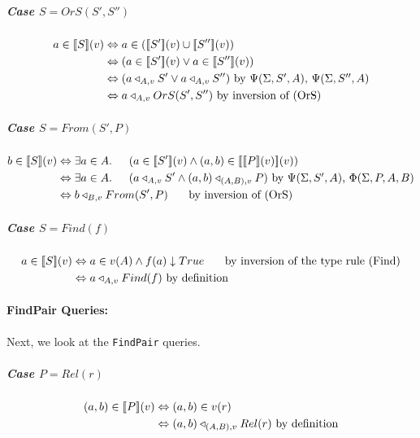 \documentclass[12pt,a4paper,twoside,openright]{report}
\newcommand\codeName[1]{\texttt{#1}}
\newcommand{\db}[1]{{\bf [\![}#1{\bf ]\!]}}
\newcommand{\deno}[1]{\db{#1}(v)}
\newcommand{\denoRule}[2]{#1 \in \deno{#2}}
\newcommand{\opRule}[3]{#1 \triangleleft_{#2, v} #3}
\newcommand{\phiRule}[3]{\Phi(\Sigma, #1, #2, #3)}
\newcommand{\psiRule}[2]{\Psi(\Sigma, #1, #2)}
\let\oldparagraph\paragraph
\renewcommand{\paragraph}[1]{\oldparagraph{#1}\mbox{}}
\let\oldsubparagraph\subparagraph
\renewcommand{\subparagraph}[1]{\oldsubparagraph{#1}\mbox{}}
\begin{document}
\subparagraph{Case $S = OrS(S', S'')$}
\begin{equation} \label{case OrS}
\begin{split}
\denoRule{a}{S} & \Leftrightarrow a \in (\deno{S'} \cup \deno{S''}) \\
				& \Leftrightarrow (\denoRule{a}{S'} \vee \denoRule{a}{S''}) \\
				& \Leftrightarrow (\opRule{a}{A}{S'} \vee \opRule{a}{A}{S''}) \mbox{ by $\psiRule{S'}{A}$, $\psiRule{S''}{A}$}\\
				& \Leftrightarrow \opRule{a}{A}{OrS(S', S'')} \mbox{ by inversion of (OrS)}
\end{split}
\end{equation}

\subparagraph{Case $S = From(S', P)$}
\begin{equation} \label{case From}
\begin{split}
\denoRule{b}{S} & \Leftrightarrow \exists a \in A. \indent (\denoRule{a}{S'} \wedge \denoRule{(a, b)}{\deno{P}}) \\
				& \Leftrightarrow \exists a \in A. \indent (\opRule{a}{A}{S'} \wedge \opRule{(a, b)}{(A, B)}{P}) \mbox{ by $\psiRule{S'}{A}$, $\phiRule{P}{A}{B}$}\\
				& \Leftrightarrow \opRule{b}{B}{From(S', P)} \indent\mbox{ by inversion of (OrS)}
\end{split}
\end{equation}

\subparagraph{Case $S = Find(f)$}
\begin{equation} \label{case Find}
\begin{split}
\denoRule{a}{S} & \Leftrightarrow a \in v(A) \wedge f(a) \downarrow True  \indent \mbox{ by inversion of the type rule (Find)}\\
				& \Leftrightarrow \opRule{a}{A}{Find(f)} \mbox{ by definition}\\
\end{split}
\end{equation}

\paragraph{FindPair Queries:} Next, we look at the \codeName{FindPair} queries.
\\
\subparagraph{Case $P = Rel(r)$}
\begin{equation} \label{case Rel}
\begin{split}
\denoRule{(a, b)}{P} & \Leftrightarrow (a, b) \in v(r)\\
				& \Leftrightarrow \opRule{(a, b)}{(A, B)}{Rel(r)} \mbox{ by definition}\\
\end{split}
\end{equation}
\end{document}
